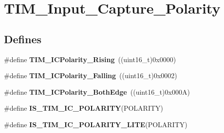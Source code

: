 \hypertarget{group__TIM__Input__Capture__Polarity}{
\section{TIM\_\-Input\_\-Capture\_\-Polarity}
\label{group__TIM__Input__Capture__Polarity}
}
\subsection*{Defines}
\begin{DoxyCompactItemize}
\item 
\hypertarget{group__TIM__Input__Capture__Polarity_gabe598596b7dbcac446a4918105fa95a6}{
\#define {\bfseries TIM\_\-ICPolarity\_\-Rising}~((uint16\_\-t)0x0000)}
\label{group__TIM__Input__Capture__Polarity_gabe598596b7dbcac446a4918105fa95a6}

\item 
\hypertarget{group__TIM__Input__Capture__Polarity_ga70c6f5ed30a236bac4c690928e742243}{
\#define {\bfseries TIM\_\-ICPolarity\_\-Falling}~((uint16\_\-t)0x0002)}
\label{group__TIM__Input__Capture__Polarity_ga70c6f5ed30a236bac4c690928e742243}

\item 
\hypertarget{group__TIM__Input__Capture__Polarity_ga4632a6425d407c0d28b610b2d31cccc8}{
\#define {\bfseries TIM\_\-ICPolarity\_\-BothEdge}~((uint16\_\-t)0x000A)}
\label{group__TIM__Input__Capture__Polarity_ga4632a6425d407c0d28b610b2d31cccc8}

\item 
\#define {\bfseries IS\_\-TIM\_\-IC\_\-POLARITY}(POLARITY)
\item 
\#define {\bfseries IS\_\-TIM\_\-IC\_\-POLARITY\_\-LITE}(POLARITY)
\end{DoxyCompactItemize}



